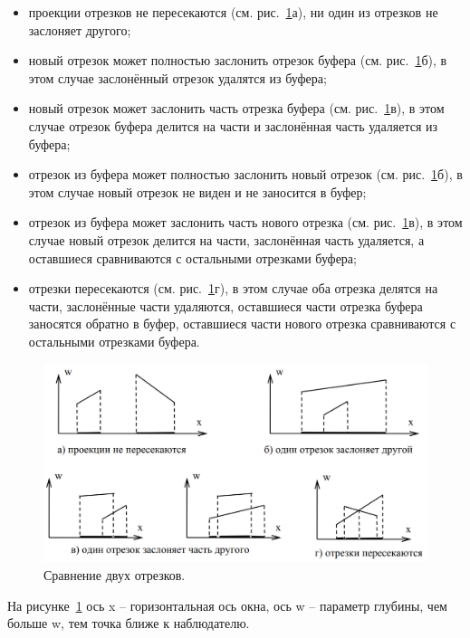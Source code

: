 \begin{itemize}
\item проекции отрезков не пересекаются (см. рис.~\ref{fig:Sbuff_algorithm_1}а), ни один из отрезков не заслоняет другого;
\item новый отрезок может полностью заслонить отрезок буфера (см. рис.~\ref{fig:Sbuff_algorithm_1}б), в этом случае заслонённый отрезок удалятся из буфера;
\item новый отрезок может заслонить часть отрезка буфера (см. рис.~\ref{fig:Sbuff_algorithm_1}в), в этом случае отрезок буфера делится на части и заслонённая часть удаляется из буфера;
\item отрезок из буфера может полностью заслонить новый отрезок (см.
рис.~\ref{fig:Sbuff_algorithm_1}б), в этом случае новый отрезок не виден и не заносится в буфер;
\item отрезок из буфера может заслонить часть нового отрезка (см. рис.~\ref{fig:Sbuff_algorithm_1}в), в этом случае новый отрезок делится на части, заслонённая часть удаляется, а оставшиеся сравниваются с остальными отрезками буфера;
\item отрезки пересекаются (см. рис.~\ref{fig:Sbuff_algorithm_1}г), в этом случае оба отрезка делятся на части, заслонённые части удаляются, оставшиеся части отрезка буфера заносятся обратно в буфер, оставшиеся части нового отрезка сравниваются с остальными отрезками буфера. 
\end{itemize}

\begin{figure}[H]
    \centering
    \includegraphics[width=\textwidth]{img/Sbuff_algorithm_1.png}
    \caption{Сравнение двух отрезков.}
    \label{fig:Sbuff_algorithm_1}
\end{figure}

На рисунке~\ref{fig:Sbuff_algorithm_1} ось x – горизонтальная ось окна, ось w – параметр глубины, чем больше w, тем точка ближе к наблюдателю.

